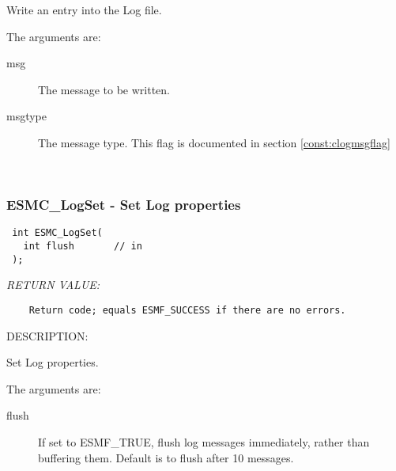   
    Write an entry into the Log file.
  
    The arguments are:
    \begin{description}
    \item[msg]
      The message to be written.
    \item[msgtype]
      The message type.  This flag is documented in section \ref{const:clogmsgflag}
    \end{description}
   
 
\mbox{}\hrulefill\ 
 
\subsubsection [ESMC\_LogSet] {ESMC\_LogSet - Set Log properties}


  
\begin{verbatim} int ESMC_LogSet(
   int flush       // in
 );\end{verbatim}{\em RETURN VALUE:}
\begin{verbatim}    Return code; equals ESMF_SUCCESS if there are no errors.\end{verbatim}
{\sf DESCRIPTION:\\ }


  
    Set Log properties.
  
    The arguments are:
    \begin{description}
    \item[flush]
      If set to ESMF\_TRUE, flush log messages immediately, rather than buffering 
      them. Default is to flush after 10 messages.
    \end{description}
  
\setlength{\parskip}{\oldparskip}
\setlength{\parindent}{\oldparindent}
\setlength{\baselineskip}{\oldbaselineskip}
